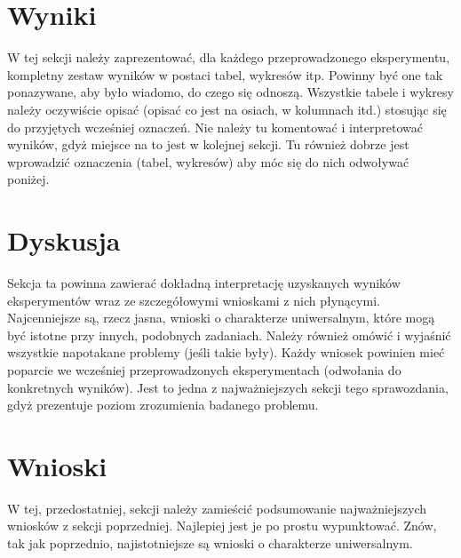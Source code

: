 \documentclass{classrep}
\begin{document}
\section{Wyniki}
W tej sekcji należy zaprezentować, dla każdego przeprowadzonego eksperymentu,
kompletny zestaw wyników w postaci tabel, wykresów itp. Powinny być one tak
ponazywane, aby było wiadomo, do czego się odnoszą. Wszystkie tabele i wykresy
należy oczywiście opisać (opisać co jest na osiach, w kolumnach itd.) stosując
się do przyjętych wcześniej oznaczeń. Nie należy tu komentować i interpretować
wyników, gdyż miejsce na to jest w kolejnej sekcji. Tu również dobrze jest
wprowadzić oznaczenia (tabel, wykresów) aby móc się do nich odwoływać
poniżej.

\section{Dyskusja}
Sekcja ta powinna zawierać dokładną interpretację uzyskanych wyników
eksperymentów wraz ze szczegółowymi wnioskami z nich płynącymi. Najcenniejsze
są, rzecz jasna, wnioski o charakterze uniwersalnym, które mogą być istotne
przy innych, podobnych zadaniach. Należy również omówić i wyjaśnić wszystkie
napotakane problemy (jeśli takie były). Każdy wniosek powinien mieć poparcie
we wcześniej przeprowadzonych eksperymentach (odwołania do konkretnych
wyników). Jest to jedna z najważniejszych sekcji tego sprawozdania, gdyż
prezentuje poziom zrozumienia badanego problemu.

\section{Wnioski}
W tej, przedostatniej, sekcji należy zamieścić podsumowanie
najważniejszych wniosków z sekcji poprzedniej. Najlepiej jest je po prostu
wypunktować. Znów, tak jak poprzednio, najistotniejsze są wnioski o
charakterze uniwersalnym.

\begin{thebibliography}{8}

\end{thebibliography}
\end{document}
